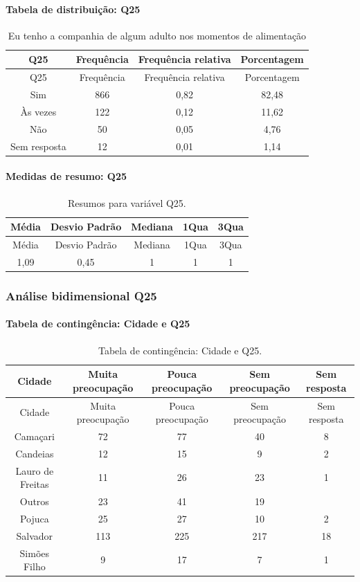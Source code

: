 \documentclass[]{article}
\let\oldparagraph\paragraph
\renewcommand{\paragraph}[1]{\oldparagraph{#1}\mbox{}}
\begin{document}
\hypertarget{tabela-de-distribuiuxe7uxe3o-q25}{%
\paragraph{Tabela de distribuição: Q25}\label{tabela-de-distribuiuxe7uxe3o-q25}}

\begin{longtable}[]{@{}cccc@{}}
\caption{\label{tab:unnamed-chunk-659}Eu tenho a companhia de algum adulto nos momentos de alimentação}\tabularnewline
\toprule
Q25 & Frequência & Frequência relativa & Porcentagem\tabularnewline
\midrule
\endfirsthead
\toprule
Q25 & Frequência & Frequência relativa & Porcentagem\tabularnewline
\midrule
\endhead
Sim & 866 & 0,82 & 82,48\tabularnewline
Às vezes & 122 & 0,12 & 11,62\tabularnewline
Não & 50 & 0,05 & 4,76\tabularnewline
Sem resposta & 12 & 0,01 & 1,14\tabularnewline
\bottomrule
\end{longtable}

\hypertarget{medidas-de-resumo-q25}{%
\paragraph{Medidas de resumo: Q25}\label{medidas-de-resumo-q25}}

\begin{longtable}[]{@{}ccccc@{}}
\caption{\label{tab:unnamed-chunk-660}Resumos para variável Q25.}\tabularnewline
\toprule
Média & Desvio Padrão & Mediana & 1Qua & 3Qua\tabularnewline
\midrule
\endfirsthead
\toprule
Média & Desvio Padrão & Mediana & 1Qua & 3Qua\tabularnewline
\midrule
\endhead
1,09 & 0,45 & 1 & 1 & 1\tabularnewline
\bottomrule
\end{longtable}

\cleardoublepage

\hypertarget{anuxe1lise-bidimensional-q25}{%
\subsubsection{Análise bidimensional Q25}\label{anuxe1lise-bidimensional-q25}}

\hypertarget{tabela-de-continguxeancia-cidade-e-q25}{%
\paragraph{Tabela de contingência: Cidade e Q25}\label{tabela-de-continguxeancia-cidade-e-q25}}

\begin{longtable}[]{@{}ccccc@{}}
\caption{\label{tab:unnamed-chunk-661}Tabela de contingência: Cidade e Q25.}\tabularnewline
\toprule
Cidade & Muita preocupação & Pouca preocupação & Sem preocupação & Sem resposta\tabularnewline
\midrule
\endfirsthead
\toprule
Cidade & Muita preocupação & Pouca preocupação & Sem preocupação & Sem resposta\tabularnewline
\midrule
\endhead
Camaçari & 72 & 77 & 40 & 8\tabularnewline
Candeias & 12 & 15 & 9 & 2\tabularnewline
Lauro de Freitas & 11 & 26 & 23 & 1\tabularnewline
Outros & 23 & 41 & 19 &\tabularnewline
Pojuca & 25 & 27 & 10 & 2\tabularnewline
Salvador & 113 & 225 & 217 & 18\tabularnewline
Simões Filho & 9 & 17 & 7 & 1\tabularnewline
\bottomrule
\end{longtable}
\end{document}
